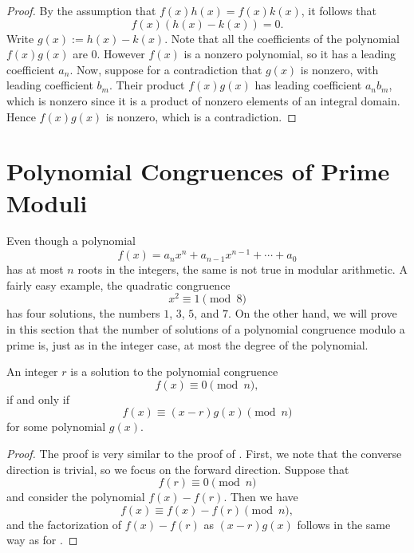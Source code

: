 \begin{proof}
  By the assumption that $f(x)h(x)=f(x)k(x)$, it follows that
  \begin{equation*}
    f(x)(h(x)-k(x))=0.
  \end{equation*}
  Write $g(x):=h(x)-k(x)$. Note that all the coefficients of the polynomial $f(x)g(x)$ are $0$. However $f(x)$ is a nonzero polynomial, so it has a leading coefficient $a_n$. Now, suppose for a contradiction that $g(x)$ is nonzero, with leading coefficient $b_m$. Their product $f(x)g(x)$ has leading coefficient $a_nb_m$, which is nonzero since it is a product of nonzero elements of an integral domain. Hence $f(x)g(x)$ is nonzero, which is a contradiction.
\end{proof}

\section{Polynomial Congruences of Prime Moduli}

Even though a polynomial
\begin{equation*}
  f(x) = a_nx^n+ a_{n-1}x^{n-1} +\cdots + a_0
\end{equation*}
has at most $n$ roots in the integers, the same is not true in modular arithmetic. A fairly easy example, the quadratic congruence
\begin{equation*}
  x^2 \equiv 1\pmod{8}
\end{equation*}
has four solutions, the numbers $1$, $3$, $5$, and $7$. On the other hand, we will prove in this section that the number of solutions of a polynomial congruence modulo a prime is, just as in the integer case, at most the degree of the polynomial.

\begin{theorem}\label{theorem:factor-theorem-modular-arithmetic}
  An integer $r$ is a solution to the polynomial congruence
  \begin{equation*}
    f(x) \equiv 0\pmod{n},
  \end{equation*}
  if and only if
  \begin{equation*}
    f(x) \equiv (x-r)g(x) \pmod{n}
  \end{equation*}
  for some polynomial $g(x)$.
\end{theorem}

\begin{proof}
  The proof is very similar to the proof of . First, we note that the converse direction is trivial, so we focus on the forward direction. Suppose that
  \begin{equation*}
    f(r) \equiv 0 \pmod{n}
  \end{equation*}
  and consider the polynomial $f(x)-f(r)$. Then we have
  \begin{equation*}
    f(x)\equiv f(x)-f(r) \pmod{n},
  \end{equation*}
  and the factorization of $f(x)-f(r)$ as $(x-r)g(x)$ follows in the same way as for .
\end{proof}

